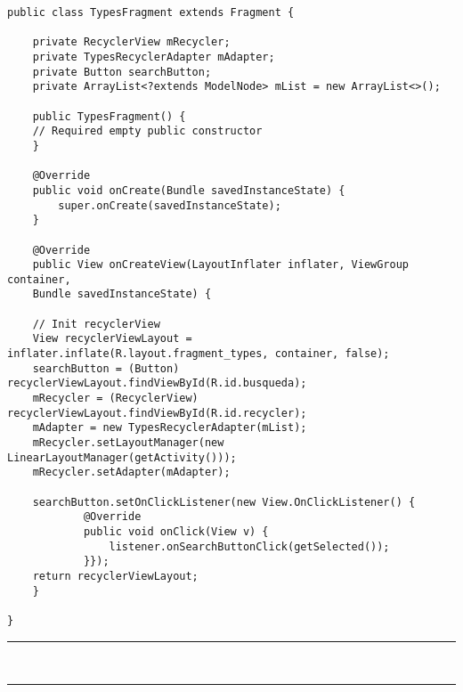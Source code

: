 \begin{lstlisting}[caption=Código de una clase que contiene un RecyclerView.]
public class TypesFragment extends Fragment {

	private RecyclerView mRecycler;
	private TypesRecyclerAdapter mAdapter;
	private Button searchButton;
	private ArrayList<?extends ModelNode> mList = new ArrayList<>();
	
	public TypesFragment() {
	// Required empty public constructor
	}
	
	@Override
	public void onCreate(Bundle savedInstanceState) {
		super.onCreate(savedInstanceState);
	}
	
	@Override
	public View onCreateView(LayoutInflater inflater, ViewGroup container,
	Bundle savedInstanceState) {
	
	// Init recyclerView
	View recyclerViewLayout = inflater.inflate(R.layout.fragment_types, container, false);
	searchButton = (Button) recyclerViewLayout.findViewById(R.id.busqueda);
	mRecycler = (RecyclerView) recyclerViewLayout.findViewById(R.id.recycler);
	mAdapter = new TypesRecyclerAdapter(mList);
	mRecycler.setLayoutManager(new LinearLayoutManager(getActivity()));
	mRecycler.setAdapter(mAdapter);
	
	searchButton.setOnClickListener(new View.OnClickListener() {
			@Override
			public void onClick(View v) {
				listener.onSearchButtonClick(getSelected());
			}});
	return recyclerViewLayout;
	}	

}
\end{lstlisting}
\noindent\rule[-1ex]{\textwidth}{1pt}\\
\newpage
\noindent\rule[-1ex]{\textwidth}{1pt}\\
